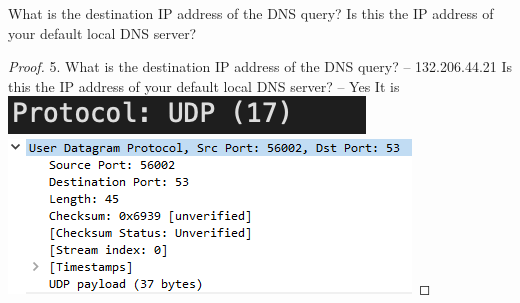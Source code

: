 \documentclass[../../main.tex]{subfiles}
\begin{document}
\begin{wts}
What is the destination IP address of the DNS query? Is this the IP address of your default local DNS server?
\end{wts}
\begin{proof}
    
5. What is the destination IP address of the DNS query? – 132.206.44.21 Is this the IP address of your default local DNS server? – Yes It is 
\includegraphics[width=\textwidth]{subfiles/images/ECSE_308_Lab_5_1_SUPA_PAGE7_20_Image59.png}
\includegraphics[width=\textwidth]{subfiles/images/ECSE_308_Lab_5_1_SUPA_PAGE8_23_Image64.png}

\end{proof}
\end{document}
